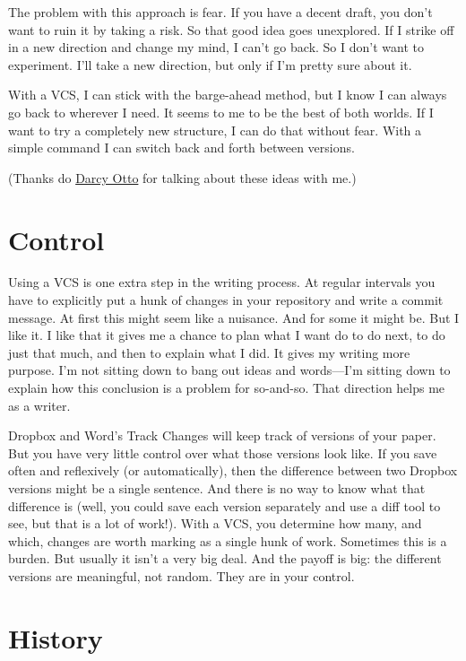 \documentclass{article}
\begin{document}
The problem with this approach is fear. If you have a decent draft, 
you don't want to ruin it by taking a risk. So that good idea goes 
unexplored. If I strike off in a new direction and change my mind, I 
can't go back. So I don't want to experiment. I'll take a new 
direction, but only if I'm pretty sure about it.

With a VCS, I can stick with the barge-ahead method, but I know I can 
always go back to wherever I need. It seems to me to be the best of 
both worlds. If I want to try a completely new structure, I can do 
that without fear. With a simple command I can switch back and forth 
between versions.

(Thanks do 
\href{http://philosophy.csusb.edu/~dotto/me/Home.html}{Darcy Otto} for 
talking about these ideas with me.)

\section{Control}

Using a VCS is one extra step in the writing process. At regular 
intervals you have to explicitly put a hunk of changes in your 
repository and write a commit message. At first this might seem like a 
nuisance. And for some it might be. But I like it. I like that it 
gives me a chance to plan what I want do to do next, to do just that 
much, and then to explain what I did. It gives my writing more 
purpose. I'm not sitting down to bang out ideas and words—I'm sitting 
down to explain how this conclusion is a problem for so-and-so. That 
direction helps me as a writer.

Dropbox and Word's Track Changes will keep track of versions of your 
paper. But you have very little control over what those versions look 
like. If you save often and reflexively (or automatically), then the 
difference between two Dropbox versions might be a single sentence. 
And there is no way to know what that difference is (well, you could 
save each version separately and use a diff tool to see, but that is a 
lot of work!). With a VCS, you determine how many, and which, changes 
are worth marking as a single hunk of work. Sometimes this is a 
burden. But usually it isn't a very big deal. And the payoff is big: 
the different versions are meaningful, not random. They are in your 
control.

\section{History}
\end{document}
